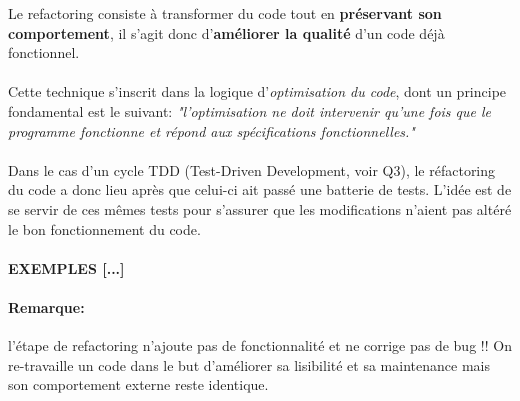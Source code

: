 \item{}
{Le refactoring consiste à transformer du code tout en \textbf{préservant son comportement}, il s'agit donc d'\textbf{améliorer la qualité} d'un code déjà fonctionnel.
\paragraph{}
Cette technique s'inscrit dans la logique d'\textit{optimisation du code}, dont un principe fondamental est le suivant: \textit{"l'optimisation ne doit intervenir qu'une fois que le programme fonctionne et répond aux spécifications fonctionnelles."}
\paragraph{}
Dans le cas d'un cycle TDD (Test-Driven Development, voir Q3), le réfactoring du code a donc lieu après que celui-ci ait passé une batterie de tests. L'idée est de se servir de ces mêmes tests pour s'assurer que les modifications n'aient pas altéré le bon fonctionnement du code.

\paragraph{EXEMPLES [...]}

\paragraph{Remarque: }
l'étape de refactoring n'ajoute pas de fonctionnalité et ne corrige pas de bug !! On re-travaille un code dans le but d'améliorer sa lisibilité et sa maintenance mais son comportement externe reste identique.

}


